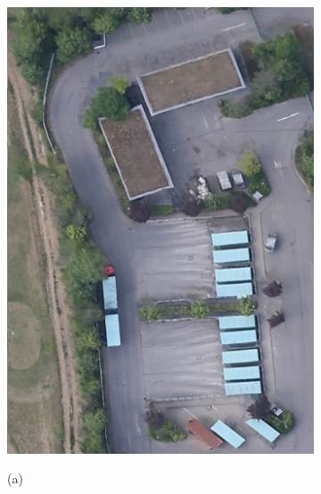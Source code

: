 \begin{figure}[tbp]
    \centering
       \begin{subfigure}[tbp]{0.24\columnwidth}
           \centering
           \includegraphics[width=\textwidth]{figures_5/germering_ortho_aerial.jpg}
           {{\small }}    
           \centerline{\small{(a)}}\medskip
       \end{subfigure}
       \hfill
       \begin{subfigure}[tbp]{0.24\columnwidth}  
           \centering 

\end{subfigure}
\end{figure}
